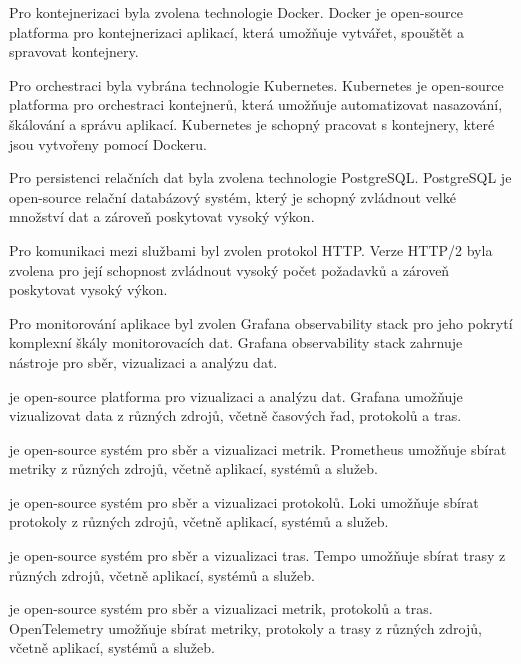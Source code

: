 Pro kontejnerizaci byla zvolena technologie Docker. Docker je open-source platforma pro kontejnerizaci aplikací, která umožňuje vytvářet, spouštět a spravovat kontejnery.

Pro orchestraci byla vybrána technologie Kubernetes. Kubernetes je open-source platforma pro orchestraci kontejnerů, která umožňuje automatizovat nasazování, škálování a správu aplikací. Kubernetes je schopný pracovat s kontejnery, které jsou vytvořeny pomocí Dockeru.


Pro persistenci relačních dat byla zvolena technologie PostgreSQL. PostgreSQL je open-source relační databázový systém, který je schopný zvládnout velké množství dat a zároveň poskytovat vysoký výkon.


Pro komunikaci mezi službami byl zvolen protokol HTTP. Verze HTTP/2 byla zvolena pro její schopnost zvládnout vysoký počet požadavků a zároveň poskytovat vysoký výkon.


Pro monitorování aplikace byl zvolen Grafana observability stack pro jeho pokrytí komplexní škály monitorovacích dat. Grafana observability stack zahrnuje nástroje pro sběr, vizualizaci a analýzu dat.


je open-source platforma pro vizualizaci a analýzu dat. Grafana umožňuje vizualizovat data z různých zdrojů, včetně časových řad, protokolů a tras.

 
je open-source systém pro sběr a vizualizaci metrik. Prometheus umožňuje sbírat metriky z různých zdrojů, včetně aplikací, systémů a služeb.


je open-source systém pro sběr a vizualizaci protokolů. Loki umožňuje sbírat protokoly z různých zdrojů, včetně aplikací, systémů a služeb.


je open-source systém pro sběr a vizualizaci tras. Tempo umožňuje sbírat trasy z různých zdrojů, včetně aplikací, systémů a služeb.


je open-source systém pro sběr a vizualizaci metrik, protokolů a tras. OpenTelemetry umožňuje sbírat metriky, protokoly a trasy z různých zdrojů, včetně aplikací, systémů a služeb.

